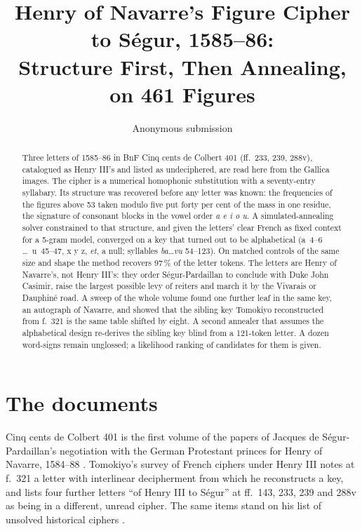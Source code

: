 \documentclass[11pt]{article}
\title{Henry of Navarre's Figure Cipher to S\'egur, 1585--86: \\ Structure First, Then Annealing, on 461 Figures}
\author{Anonymous submission}
\date{}
\begin{document}
\maketitle

\begin{abstract}
Three letters of 1585--86 in BnF Cinq cents de Colbert 401 (ff.~233, 239, 288v), catalogued as Henry III's and listed as undeciphered, are read here from the Gallica images. The cipher is a numerical homophonic substitution with a seventy-entry syllabary. Its structure was recovered before any letter was known: the frequencies of the figures above 53 taken modulo five put forty per cent of the mass in one residue, the signature of consonant blocks in the vowel order \emph{a e i o u}. A simulated-annealing solver constrained to that structure, and given the letters' clear French as fixed context for a 5-gram model, converged on a key that turned out to be alphabetical (a~4--6 \ldots\ u~45--47, x y z, \emph{et}, a null; syllables \emph{ba}\ldots\emph{vu} 54--123). On matched controls of the same size and shape the method recovers 97\,\% of the letter tokens. The letters are Henry of Navarre's, not Henry III's: they order S\'egur-Pardaillan to conclude with Duke John Casimir, raise the largest possible levy of reiters and march it by the Vivarais or Dauphin\'e road. A sweep of the whole volume found one further leaf in the same key, an autograph of Navarre, and showed that the sibling key Tomokiyo reconstructed from f.~321 is the same table shifted by eight. A second annealer that assumes the alphabetical design re-derives the sibling key blind from a 121-token letter. A dozen word-signs remain unglossed; a likelihood ranking of candidates for them is given.
\end{abstract}

\section{The documents}

Cinq cents de Colbert 401 is the first volume of the papers of Jacques de S\'egur-Pardaillan's negotiation with the German Protestant princes for Henry of Navarre, 1584--88 \cite{BnF:Colbert401}. Tomokiyo's survey of French ciphers under Henry III  notes at f.~321 a letter with interlinear decipherment from which he reconstructs a key, and lists four further letters ``of Henry III to S\'egur'' at ff.~143, 233, 239 and 288v as being in a different, unread cipher. The same items stand on his list of unsolved historical ciphers .
\end{document}
